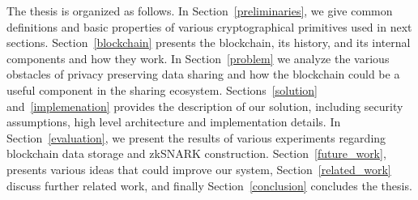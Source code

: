 The thesis is organized as follows. In Section~\ref{preliminaries}, we give common definitions and basic properties of various cryptographical primitives used in next sections. Section~\ref{blockchain} presents the blockchain, its history, and its internal components and how they work. In Section~\ref{problem} we analyze the various obstacles of privacy preserving data sharing and how the blockchain could be a useful component in the sharing ecosystem. Sections~\ref{solution} and~\ref{implemenation} provides the description of our solution, including security assumptions, high level architecture and implementation details. In Section~\ref{evaluation}, we present the results of various experiments regarding blockchain data storage and zkSNARK construction. Section~\ref{future_work}, presents various ideas that could improve our system, Section~\ref{related_work} discuss further related work, and finally Section~\ref{conclusion} concludes the thesis.
